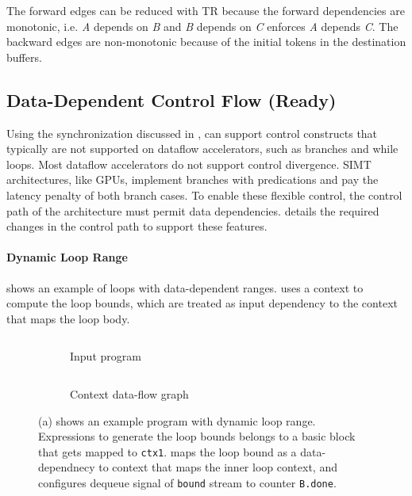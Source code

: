 The forward edges can be reduced with TR because the forward dependencies
are monotonic, i.e. \emph{A} depends on \emph{B} and \emph{B} depends on \emph{C}
enforces \emph{A} depends \emph{C}. The backward edges are non-monotonic because of the initial
tokens in the destination buffers.



\subsection{Data-Dependent Control Flow (Ready)} \label{sec:datactrl}
Using the synchronization discussed in , \name can support control constructs that 
typically are not supported on dataflow accelerators, such as branches and while loops.
Most dataflow accelerators do not support control divergence. SIMT architectures, like GPUs,
implement branches with predications and pay the latency penalty of both branch cases.
To enable these flexible control, the control path of the architecture must permit data dependencies.
 details the required changes in the control path to support these features.

\paragraph{Dynamic Loop Range}
 shows an example of loops with data-dependent ranges. 
\name uses a context to compute the loop bounds, which are treated as input dependency to the context 
that maps the loop body.
\begin{figure}
\centering
\begin{subfigure}[b]{0.4\textwidth}
\inputminted{python}{code/dynrange.py}
\caption{Input program}
\end{subfigure}
\hfill
\begin{subfigure}[b]{0.5\textwidth}
\inputminted{python}{code/dynrangectx.py}
\caption{Context data-flow graph}
\end{subfigure}
\caption[Example of dynamic loop range]{
  (a) shows an example program with dynamic loop range. 
  Expressions to generate the loop bounds belongs to a basic block that gets mapped to \texttt{ctx1}.
  \name maps the loop bound as a data-dependnecy to context that maps the inner loop context, and
  configures dequeue signal of \texttt{bound} stream to counter \texttt{B.done}.
}
\label{fig:dynrange}
\end{figure}

